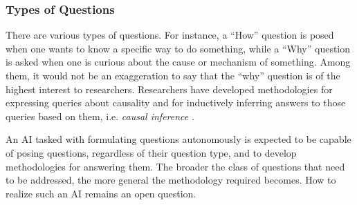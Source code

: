 

\subsubsection{Types of Questions}
There are various types of questions. For instance, a ``How'' question is posed when one wants to know a specific way to do something, while a ``Why'' question is asked when one is curious about the cause or mechanism of something. Among them, it would not be an exaggeration to say that the ``why'' question is of the highest interest to researchers. Researchers have developed methodologies for expressing queries about causality and for inductively inferring answers to those queries based on them, i.e.\textit{ causal inference} \cite{pearl2018book}.

An AI tasked with formulating questions autonomously is expected to be capable of posing questions, regardless of their question type, and to develop methodologies for answering them. The broader the class of questions that need to be addressed, the more general the methodology required becomes. How to realize such an AI remains an open question.

